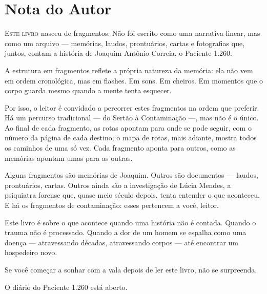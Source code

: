 \chapter*{Nota do Autor}

\lettrine[lines=3,findent=2pt,nindent=4pt]{\textcolor{sangue}{E}}{ste livro}
nasceu de fragmentos. Não foi escrito como uma narrativa linear, mas como um
arquivo --- memórias, laudos, prontuários, cartas e fotografias que, juntos,
contam a história de Joaquim Antônio Correia, o Paciente 1.260.

A estrutura em fragmentos reflete a própria natureza da memória: ela não vem
em ordem cronológica, mas em flashes. Em sons. Em cheiros. Em momentos que o
corpo guarda mesmo quando a mente tenta esquecer.

Por isso, o leitor é convidado a percorrer estes fragmentos na ordem que
preferir. Há um percurso tradicional --- do Sertão à Contaminação ---, mas
não é o único. Ao final de cada fragmento, as rotas apontam para onde se pode
seguir, com o número da página de cada destino; o mapa de rotas, mais
adiante, mostra todos os caminhos de uma só vez. Cada fragmento aponta para
outros, como as memórias apontam umas para as outras.

Alguns fragmentos são memórias de Joaquim. Outros são documentos --- laudos,
prontuários, cartas. Outros ainda são a investigação de Lúcia Mendes, a
psiquiatra forense que, quase meio século depois, tenta entender o que
aconteceu. E há os fragmentos de contaminação: esses pertencem a você, leitor.

Este livro é sobre o que acontece quando uma história não é contada. Quando o
trauma não é processado. Quando a dor de um homem se espalha como uma doença
--- atravessando décadas, atravessando corpos --- até encontrar um hospedeiro
novo.

Se você começar a sonhar com a vala depois de ler este livro, não se
surpreenda.

O diário do Paciente 1.260 está aberto.

\cleardoublepage
